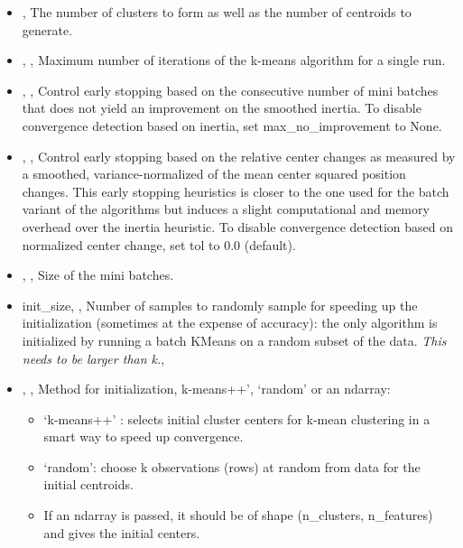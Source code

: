 \begin{itemize}
	\item {}, 
The number of clusters to form as well as the number of centroids to
generate. 
	\item {}, ,
Maximum number of iterations of the k-means algorithm for a single run.
	\item {}, , Control early stopping based on the consecutive number of mini
 batches that does not yield an improvement on the smoothed inertia.
To disable convergence detection based on inertia, set
max\_no\_improvement to None. 
	\item {}, , Control
 early stopping based on the relative center changes as measured by a
smoothed, variance-normalized of the mean center squared position changes.
 This early stopping heuristics is closer to the one used for the batch
 variant of the algorithms but induces a slight computational and memory
overhead over the inertia heuristic. To disable convergence detection
based on normalized center change, set tol to 0.0 (default). 
	\item {}, ,
Size of the mini batches. 
	\item{init\_size}, , Number of
samples to randomly sample for speeding up the initialization
 (sometimes at the expense of accuracy): the only algorithm is initialized
 by running a batch KMeans on a random subset of the data.
\textit{This needs to be larger than k.}, 
	\item {}, ,
Method for initialization, k-means++’, ‘random’ or an ndarray:
		\begin{itemize}
			\item ‘k-means++’ : selects initial cluster
centers for k-mean clustering in a smart way to speed up convergence.
			\item ‘random’: choose k observations (rows) at
 random from data for the initial centroids.
			\item If an ndarray is passed, it should be of
 shape (n\_clusters, n\_features) and gives the initial centers.
		\end{itemize}

\end{itemize}
